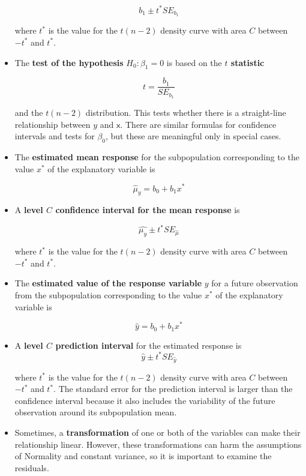 \begin{itemize}
			\[b_1 \pm t^{*}SE_{b_1}\]
			
			where $t^{*}$ is the value for the $t(n- 2)$ density curve with area $C$ between $-t^{*}$ and $t^{*}$.
			
			\item The \textbf{test of the hypothesis} $H_0: \beta_1 = 0$ is based on the \textbf{$t$ statistic}
			
			\[t=\frac{b_1}{SE_{b_1}}\]
			
			and the $t(n - 2)$ distribution. This tests whether there is a straight-line relationship between $y$ and $\mathsf{x}$. There are similar formulas for confidence intervals and tests for $\beta_0$, but these are meaningful only in special cases.
			
			\item The \textbf{estimated mean response} for the subpopulation corresponding to the value $x^{*}$ of the explanatory variable is
			
			\[\widehat{\mu}_y = b_0 + b_1 x^{*}\]
			
			\item A \textbf{level $C$ confidence interval for the mean response} is
			
			\[\widehat{\mu_y} \pm t^{*} SE_{\widehat{\mu}}\]
			
			where $t^{*}$ is the value for the $t(n- 2)$ density curve with area $C$ between $-t^{*}$ and $t^{*}$.
			
			\item The \textbf{estimated value of the response variable} $y$ for a future observation from the subpopulation corresponding to the value $x^{*}$ of the explanatory variable is
			
			\[\hat{y}=b_0+b_1 x^{*}\]
			
			\item A \textbf{level $C$ prediction interval} for the estimated response is
			\[\hat{y} \pm t^{*} SE_{\hat{y}}\]
			
			where $t^{*}$ is the value for the $t(n - 2)$ density curve with area $C$ between $-t^{*}$ and $t^{*}$. The standard error for the prediction interval is larger than the confidence interval because it also includes the variability of the future observation around its subpopulation mean.
			
			\item Sometimes, a \textbf{transformation} of one or both of the variables can make their relationship linear. However, these transformations can harm the assumptions of Normality and constant variance, so it is important to examine the residuals.
		\end{itemize}
